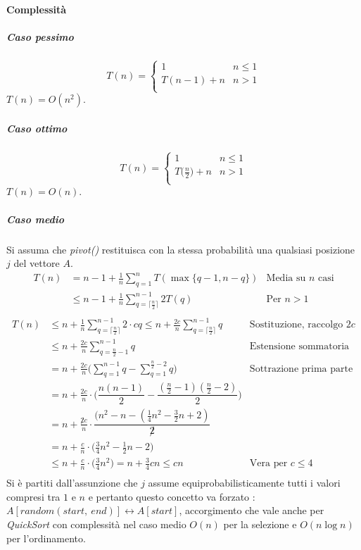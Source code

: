 \paragraph{Complessit\`a}
\subparagraph{Caso pessimo}
$$T(n) = 
\begin{cases}
	1 & n\le 1\\
	T(n - 1) + n & n > 1\\
\end{cases}
$$
$T(n) = O(n^2)$.
\subparagraph{Caso ottimo}
$$T(n) = 
\begin{cases}
	1 & n\le 1\\
	T\bigl(\frac{n}{2}\bigr) + n & n > 1\\
\end{cases}
$$
$T(n) = O(n)$.
\subparagraph{Caso medio}\mbox{}
Si assuma che \emph{pivot()} restituisca con la stessa probabilit\`a una qualsiasi posizione $j$ del vettore $A$.
\begin{align*}
	T(n) &= n - 1 + \frac{1}{n}\sum\limits_{q = 1}^n T(\max\{q - 1, n - q\}) & \text{Media su } n \text{ casi}\\
	     &\le n - 1 + \frac{1}{n}\sum\limits_{q = \lceil\frac{n}{2}\rceil}^{n-1}2T(q) & \text{Per } n > 1\\
\end{align*}
\begin{align*}
	T(n) &\le n + \frac{1}{n}\sum\limits_{q = \lceil\frac{n}{2}\rceil}^{n-1}2\cdot cq\le n + \frac{2c}{n}\sum\limits_{q = \lceil\frac{n}{2}\rceil}^{n-1}q &\text{Sostituzione, raccolgo } 2c\\
	     &\le n + \frac{2c}{n}\sum\limits_{q = \frac{n}{2}-1}^{n-1}q &\text{Estensione sommatoria}\\
	     &= n + \frac{2c}{n}\biggl(\sum\limits_{q = 1}^{n-1} q - \sum\limits_{q = 1}^{\frac{n}{2}-2} q\biggr) &\text{Sottrazione prima parte}\\
	     &= n + \frac{2c}{n}\cdot\biggl(\dfrac{n(n-1)}{2}-\dfrac{(\frac{n}{2} - 1)(\frac{n}{2} - 2)}{2}\biggr)\\
	     &= n + \frac{\not2c}{n}\cdot\dfrac{(n^2 - n - (\frac{1}{4}n^2-\frac{3}{2}n + 2)}{\not2}\\
	     &= n + \frac{c}{n}\cdot\biggl(\frac{3}{4}n^2-\frac{1}{2}n-2\biggr)\\
	     &\le n + \frac{c}{n}\cdot\biggl(\frac{3}{4}n^2\biggr) = n + \frac{3}{4}cn \le cn &\text{Vera per }c\le 4\\
\end{align*}
Si \`e partiti dall'assunzione che $j$ assume equiprobabilisticamente tutti i valori compresi tra $1$ e $n$ e pertanto questo concetto va forzato : $A[random(start,\ end)]\leftrightarrow
A[start]$, accorgimento che vale anche per \emph{QuickSort} con complessit\`a nel caso medio $O(n)$ per la selezione e $O(n\log n)$ per l'ordinamento. 
